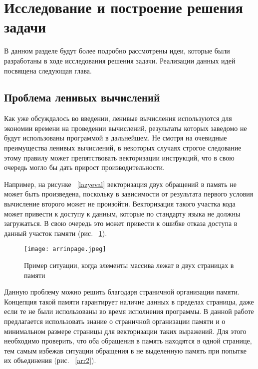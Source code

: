\section{Исследование и построение решения задачи}
\label{sec:Chapter3} 


В данном разделе будут более подробно рассмотрены идеи, которые были разработаны в ходе исследования решения задачи. Реализации данных идей посвящена следующая глава. 

\subsection{Проблема ленивых вычислений}

Как уже обсуждалось во введении, ленивые вычисления используются для экономии времени на проведении вычислений, результаты которых заведомо не будут использованы программой в дальнейшем. Не смотря на очевидные преимущества ленивых вычислений, в некоторых случаях строгое следование этому правилу может препятствовать векторизации инструкций, что в свою очередь могло бы дать прирост производительности.

Например, на рисунке ~\ref{lazyeval} векторизация двух обращений в память не может быть произведена, поскольку в зависимости от результата первого условия вычисление второго может не произойти. Векторизация такого участка кода может привести к доступу к данным, которые по стандарту языка не должны загружаться. В свою очередь это может привести к ошибке отказа доступа в данный участок памяти (рис. ~\ref{arr1}).

\begin{figure}[!htb]
    \centering
    \texttt{[image: arrinpage.jpeg]}
    \caption{Пример ситуации, когда элементы массива лежат в двух страницах в памяти}
    \label{arr1}
\end{figure}

Данную проблему можно решить благодаря страничной организации памяти. Концепция такой памяти гарантирует наличие данных в пределах страницы, даже если те не были использованы во время исполнения программы. В данной работе предлагается использовать знание о страничной организации памяти и о минимальном размере страницы для векторизации таких выражений. Для этого необходимо проверить, что оба обращения в память находятся в одной странице, тем самым избежав ситуации обращения в не выделенную память при попытке их объединения (рис. ~\ref{arr2}).

